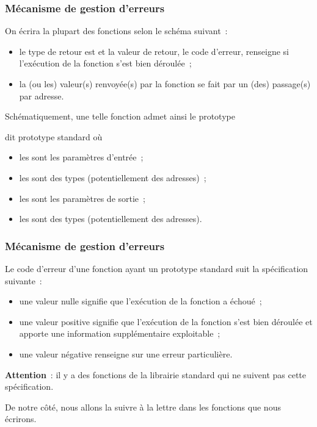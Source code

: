 \begin{frame} \frametitle{Mécanisme de gestion d'erreurs}
On écrira la plupart des fonctions selon le schéma suivant~:

\begin{itemize}
    \item le type de retour est  et la valeur de retour, le 
    \alert{code d'erreur}, renseigne si l'exécution de la fonction s'est 
    bien déroulée~;
    \smallskip
    
    \item la (ou les) valeur(s) \og renvoyée(s) \fg{} par la fonction 
    se fait par un (des) passage(s) par adresse.
\end{itemize}
\bigskip

Schématiquement, une telle fonction admet ainsi le prototype
\begin{center}
\end{center}
dit \alert{prototype standard} où

\begin{itemize}
    \item les  sont les paramètres d'entrée~;
    \smallskip
    
    \item les  sont des types (potentiellement des adresses)~;
    \smallskip
    
    \item les  sont les paramètres de sortie~;
    \smallskip
    
    \item les  sont des types (potentiellement des adresses).
\end{itemize}
\end{frame}

\begin{frame} \frametitle{Mécanisme de gestion d'erreurs}
Le \alert{code d'erreur} d'une fonction ayant un prototype standard 
suit la spécification suivante~:

\begin{itemize}
    \item une valeur nulle  signifie que l'exécution de la 
    fonction a échoué~;
    \smallskip
    
    \item une valeur positive signifie que l'exécution de la fonction 
    s'est bien déroulée et apporte une information supplémentaire 
    exploitable~;
    \smallskip
    
    \item une valeur négative renseigne sur une erreur particulière.
\end{itemize}
\bigskip
\bigskip

{\bf Attention}~: il y a des fonctions de la librairie standard qui ne 
suivent pas cette spécification.
\smallskip

De notre côté, nous allons la suivre à la lettre dans les fonctions que 
nous écrirons.
\end{frame}

